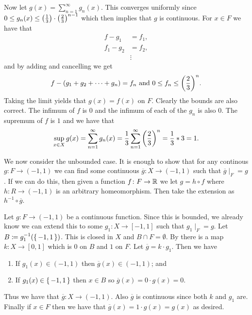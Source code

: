 \documentclass[letterpaper, 11pt, oneside]{book}
\begin{document}
\begin{pf}
  \clearpage

  Now let $g(x) = \sum_{n = 1}^{\infty} g_{n}(x)$.
  This converges uniformly since $0 \leq g_{n}(x) \leq \pqty{\frac{1}{3}} \cdot\pqty{\frac{2}{3}}^{n - 1}$ which then implies that $g$ is continuous.
  For $x \in F$ we have that
  \begin{align*}
    f - g_{1}     &= f_{1}, \\
    f_{1} - g_{2} &= f_{2}, \\
                  &\vdots
  \end{align*}
  and by adding and cancelling we get
  \[
    f - (g_{1} + g_{2} + \cdots + g_{n}) = f_{n} \text{ and } 0 \leq f_{n} \leq \pqty{\frac{2}{3}}^{n}.
  \]
  Taking the limit yields that $g(x) = f(x)$ on $F$.
  Clearly the bounds are also correct.
  The infimum of $f$ is $0$ and the infimum of each of the $g_{n}$ is also $0$.
  The supremum of $f$ is $1$ and we have that
  \[
    \sup_{x \in X} g(x) = \sum_{n = 1}^{\infty} g_{n}(x) = \frac{1}{3} \sum_{n = 1}^{\infty} \pqty{\frac{2}{3}}^{n} = \frac{1}{3} * 3 = 1.
  \]

  We now consider the unbounded case.
  It is enough to show that for any continous $g\colon F \to (-1, 1)$ we can find some continuous $\overline{g}\colon X \to (-1, 1)$ such that $\overline{g}\mid_{F} = g$.
  If we can do this, then given a function $f\colon F \to \mathbb{R}$ we let $g = h \circ f$ where $h\colon R \to (-1, 1)$ is an arbitrary homeomorphism.
  Then take the extension as $h^{-1} \circ \overline{g}$.

  Let $g\colon F \to (-1, 1)$ be a continuous function.
  Since this is bounded, we already know we can extend this to some $g_{1}\colon X \to [-1, 1]$ such that $g_{1}\mid_{F} = g$.
  Let $B \defeq g_{1}^{-1}\pqty{\set{-1, 1}}$.
  This is closed in $X$ and $B \cap F = \emptyset$.
  By  there is a map $k\colon X \to [0, 1]$ which is $0$ on $B$ and $1$ on $F$.
  Let $\overline{g} = k \cdot g_{1}$.
  Then we have
  \begin{enumerate}
  \item If $g_{1}(x) \in (-1, 1)$ then $\overline{g}(x) \in (-1, 1)$; and
  \item If $g_{1}(x) \in \set{-1, 1}$ then $x \in B$ so $\overline{g}(x) = 0 \cdot g(x) = 0$.
  \end{enumerate}
  Thus we have that $\overline{g}\colon X \to (-1, 1)$.
  Also $\overline{g}$ is continuous since both $k$ and $g_{1}$ are.
  Finally if $x \in F$ then we have that $\overline{g}(x) = 1 \cdot g(x) = g(x)$ as desired.
\end{pf}
\end{document}
